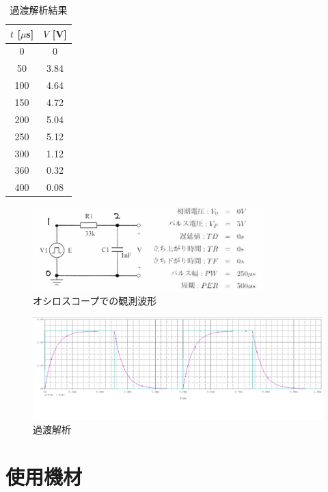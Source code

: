 \documentclass{jlreq}
\numberwithin{equation}{section}
\begin{document}
\begin{table}[H]
  \centering
  \caption{過渡解析結果}
  \begin{tabular}{|c|c|}
    \hline
    \( t \) [\(\mu\)s] & \( V \) [V] \\ \hline
    0 & 0 \\ \hline
    50 & 3.84 \\ \hline
    100 & 4.64 \\ \hline
    150 & 4.72 \\ \hline
    200 & 5.04 \\ \hline
    250 & 5.12 \\ \hline
    300 & 1.12 \\ \hline
    360 & 0.32 \\ \hline
    400 & 0.08 \\ \hline
  \end{tabular}
\end{table}

\begin{figure}[H]
  \centering
  \includegraphics[width=0.8\textwidth]{assets/katokaisekikairo.png}
  \caption{オシロスコープでの観測波形}
\end{figure}

\begin{figure}[H]
  \centering
  \includegraphics[width=\textwidth]{assets/katokaisekiplot.png}
  \caption{過渡解析}
\end{figure}

\section{使用機材}
\end{document}
